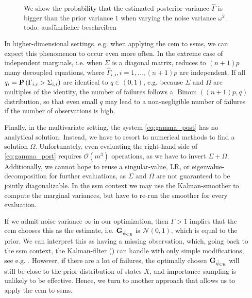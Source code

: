 \begin{figure}
    \resizebox{\textwidth}{!}{%
    }
    \caption{
        We show the probability that the estimated posterior variance $\hat \Gamma$ is bigger than the prior variance $1$ when varying the noise variance $\omega^{2}$. {\color{red} todo: ausführlicher beschreiben} %
    }
    \label{fig:ce_prob_failure}
\end{figure}

In higher-dimensional settings, e.g. when applying the \gls{cem} to \glspl{ssm}, we can expect this phenomenon to occur even more often. In the extreme case of independent marginals, i.e. when $\Sigma$ is a diagonal matrix,  reduces to $(n + 1)p$ many decoupled equations, where $\hat \Gamma_{i,i}, i =1, \dots, (n + 1)p$ are independent. If all $q_{i} = \P \left(\Gamma_{i,i} > \Sigma_{i,i}\right)$ are identical to $q \in (0, 1)$, e.g. because $\Sigma$ and $\Omega$ are multiples of the identity, the number of failures follows a $\operatorname{Binom} \left( (n + 1)p, q \right)$ distribution, so that even small $q$ may lead to a non-negligible number of failures if the number of observations is high. 

Finally, in the multivariate setting, the system \eqref{eq:gamma_post} has no analytical solution. Instead, we have to resort to numerical methods to find a solution $\Omega$. Unfortunately, even evaluating the right-hand side of \eqref{eq:gamma_post} requires $\mathcal O(m^3)$ operations, as we have to invert $\Sigma + \Omega$. Additionally, we cannot hope to reuse a singular-value, LR, or eigenvalue-decomposition for further evaluations, as $\Sigma$ and $\Omega$ are not guaranteed to be jointly diagonalizable.
In the \gls{ssm} context we may use the Kalman-smoother to compute the marginal variances, but have to re-run the smoother for every evaluation. 

If we admit noise variance $\infty$ in our optimization, then $\Gamma > 1$ implies that the \gls{cem} chooses this as the estimate, i.e. $\G_{\hpce}$ is $\mathcal N(0, 1)$, which is equal to the prior. We can interpret this as having a missing observation, which, going back to the \gls{ssm} context, the Kalman-filter () can handle with only simple modifications, see e.g. \cite[Section 4.10]{Durbin2012Time}. However, if there are a lot of failures, the optimally chosen $\G_{\hpce}$ will still be close to the prior distribution of states $X$, and importance sampling is unlikely to be effective. Hence, we turn to another approach that allows us to apply the \gls{cem} to \glspl{ssm}.


